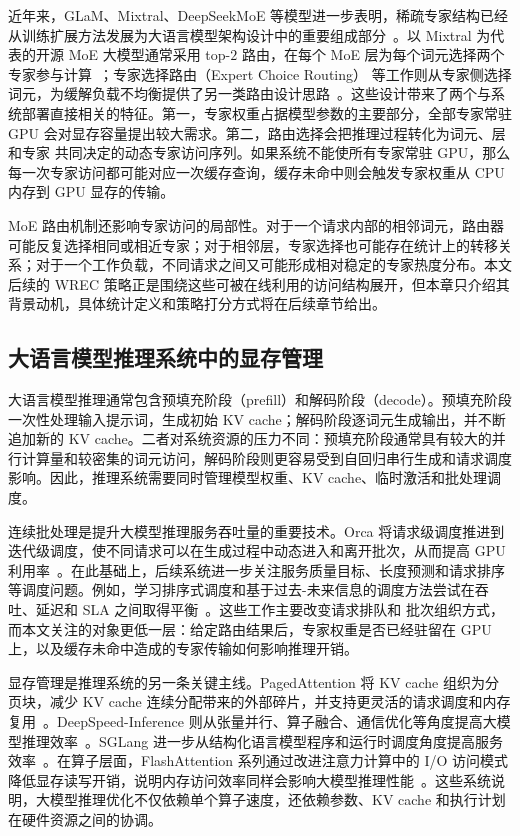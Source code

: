 近年来，GLaM、Mixtral、DeepSeekMoE 等模型进一步表明，稀疏专家结构已经从训练扩展方法发展为大语言模型架构设计中的重要组成部分~\cite{glam,jiang2024mixtral,deepseekmoe2024}。以 Mixtral 为代表的开源 MoE 大模型通常采用 top-$2$ 路由，在每个 MoE 层为每个词元选择两个专家参与计算~\cite{jiang2024mixtral}；专家选择路由（Expert Choice Routing） 等工作则从专家侧选择词元，为缓解负载不均衡提供了另一类路由设计思路~\cite{zhou2022expertchoice}。这些设计带来了两个与系统部署直接相关的特征。第一，专家权重占据模型参数的主要部分，全部专家常驻 GPU 会对显存容量提出较大需求。第二，路由选择会把推理过程转化为词元、层和专家 共同决定的动态专家访问序列。如果系统不能使所有专家常驻 GPU，那么每一次专家访问都可能对应一次缓存查询，缓存未命中则会触发专家权重从 CPU 内存到 GPU 显存的传输。

MoE 路由机制还影响专家访问的局部性。对于一个请求内部的相邻词元，路由器可能反复选择相同或相近专家；对于相邻层，专家选择也可能存在统计上的转移关系；对于一个工作负载，不同请求之间又可能形成相对稳定的专家热度分布。本文后续的 WREC 策略正是围绕这些可被在线利用的访问结构展开，但本章只介绍其背景动机，具体统计定义和策略打分方式将在后续章节给出。

\subsection{大语言模型推理系统中的显存管理}

大语言模型推理通常包含预填充阶段（prefill）和解码阶段（decode）。预填充阶段一次性处理输入提示词，生成初始 KV cache；解码阶段逐词元生成输出，并不断追加新的 KV cache。二者对系统资源的压力不同：预填充阶段通常具有较大的并行计算量和较密集的词元访问，解码阶段则更容易受到自回归串行生成和请求调度影响。因此，推理系统需要同时管理模型权重、KV cache、临时激活和批处理调度。

连续批处理是提升大模型推理服务吞吐量的重要技术。Orca 将请求级调度推进到迭代级调度，使不同请求可以在生成过程中动态进入和离开批次，从而提高 GPU 利用率~\cite{yu2022orca}。在此基础上，后续系统进一步关注服务质量目标、长度预测和请求排序等调度问题。例如，学习排序式调度和基于过去-未来信息的调度方法尝试在吞吐、延迟和 SLA 之间取得平衡~\cite{fu2024efficient,gong2024pastfuture}。这些工作主要改变请求排队和 批次组织方式，而本文关注的对象更低一层：给定路由结果后，专家权重是否已经驻留在 GPU 上，以及缓存未命中造成的专家传输如何影响推理开销。

显存管理是推理系统的另一条关键主线。PagedAttention 将 KV cache 组织为分页块，减少 KV cache 连续分配带来的外部碎片，并支持更灵活的请求调度和内存复用~\cite{kwon2023pagedattention}。DeepSpeed-Inference 则从张量并行、算子融合、通信优化等角度提高大模型推理效率~\cite{aminabadi2022deepspeed}。SGLang 进一步从结构化语言模型程序和运行时调度角度提高服务效率~\cite{zheng2024sglang}。在算子层面，FlashAttention 系列通过改进注意力计算中的 I/O 访问模式降低显存读写开销，说明内存访问效率同样会影响大模型推理性能~\cite{dao2022flashattention,dao2023flashattention2}。这些系统说明，大模型推理优化不仅依赖单个算子速度，还依赖参数、KV cache 和执行计划在硬件资源之间的协调。


